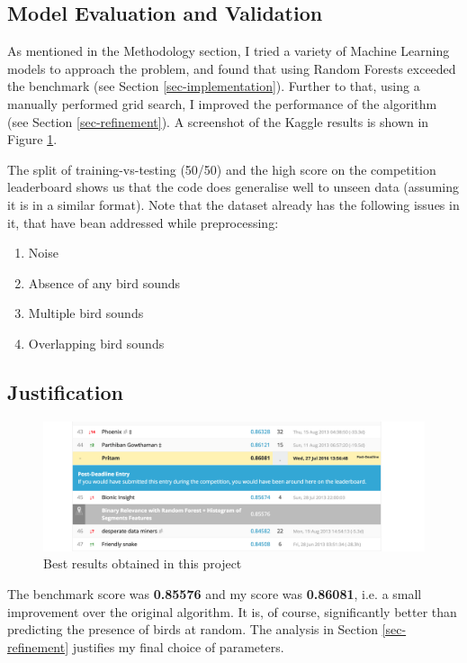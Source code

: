 \documentclass[11pt]{article}
\begin{document}
\subsection{Model Evaluation and Validation}

As mentioned in the Methodology section, I tried a variety of Machine Learning models to approach the problem, and found that using Random Forests exceeded the benchmark (see Section \ref{sec-implementation}). Further to that, using a manually performed grid search, I improved the performance of the algorithm (see Section \ref{sec-refinement}). A screenshot of the Kaggle results is shown in Figure \ref{kaggle_results}.

The split of training-vs-testing (50/50) and the high score on the competition leaderboard shows us that the code does generalise well to unseen data (assuming it is in a similar format). Note that the dataset already has the following issues in it, that have bean addressed while preprocessing:

\begin{enumerate}
\item Noise
\item Absence of any bird sounds
\item Multiple bird sounds
\item Overlapping bird sounds
\end{enumerate}

\subsection{Justification}

\begin{figure}[htbp]
\begin{center}
\includegraphics[width=1.0\textwidth]{../kaggle_results.png}
\caption{Best results obtained in this project}
\label{kaggle_results}
\end{center}
\end{figure}

The benchmark score was \textbf{0.85576} and my score was \textbf{0.86081}, i.e. a small improvement over the original algorithm. It is, of course, significantly better than predicting the presence of birds at random. The analysis in Section \ref{sec-refinement} justifies my final choice of parameters. 
\end{document}
